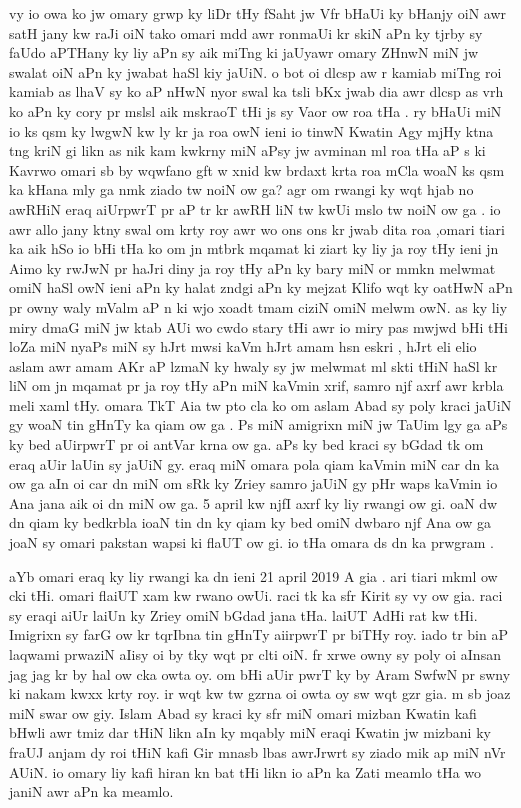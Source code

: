 \documentclass[a4paper]{article}
\begin{document}
vy io owa ko jw omary grwp ky liDr tHy  fSaht  jw Vfr bHaUi ky bHanjy oiN awr satH jany kw raJi oiN tako omari mdd awr ronmaUi kr   skiN aPn ky tjrby sy faUdo aPTHany ky liy                                                                                                                                    aPn sy aik miTng ki jaUyawr omary ZHnwN miN jw swalat oiN aPn ky jwabat haSl kiy jaUiN.
o bot oi dlcsp aw r kamiab miTng roi  kamiab  as lhaV sy ko aP nHwN nyor swal ka tsli bKx jwab dia awr dlcsp as vrh ko aPn ky cory pr mslsl aik mskraoT tHi js sy Vaor ow roa tHa  .
ry bHaUi miN io ks qsm ky lwgwN kw ly kr ja roa owN ieni io tinwN Kwatin Agy mjHy ktna tng kriN gi likn as nik kam kwkrny miN  aPsy jw avminan ml roa tHa aP s ki  Kavrwo omari sb by wqwfano gft w xnid kw brdaxt krta roa mCla woaN ks qsm ka kHana mly ga nmk ziado tw noiN ow ga? agr om rwangi ky wqt hjab no awRHiN  eraq  aiUrpwrT pr aP tr kr awRH liN tw kwUi mslo tw noiN ow ga .
io awr allo jany ktny swal om krty roy awr wo ons ons kr jwab dita roa     ,omari tiari ka aik hSo io bHi tHa ko om jn mtbrk mqamat ki ziart ky liy ja  roy tHy ieni jn Aimo ky rwJwN pr haJri diny ja roy tHy aPn ky bary miN or mmkn melwmat omiN haSl owN ieni aPn ky halat zndgi aPn ky mejzat Klifo wqt ky oatHwN aPn pr owny waly mValm aP n ki wjo xoadt tmam ciziN omiN melwm owN.
as ky liy miry dmaG miN jw ktab AUi wo cwdo stary tHi awr io miry pas mwjwd bHi tHi loZa miN nyaPs miN sy hJrt mwsi kaVm hJrt  amam hsn eskri , hJrt eli elio aslam awr amam AKr aP lzmaN ky hwaly sy jw melwmat ml skti tHiN haSl  kr liN om jn mqamat pr ja roy tHy aPn miN kaVmin xrif, samro njf axrf awr krbla meli xaml tHy.
omara TkT Aia tw  pto cla  ko om aslam Abad sy poly kraci jaUiN gy woaN tin gHnTy ka qiam ow ga .
Ps miN amigrixn miN jw TaUim lgy ga aPs ky bed aUirpwrT pr oi antVar krna ow ga.
aPs ky bed kraci sy bGdad tk om eraq aUir laUin sy jaUiN  gy.
eraq miN omara pola qiam kaVmin miN car dn ka ow ga aIn oi car dn miN om sRk ky Zriey samro  jaUiN gy pHr waps  kaVmin io Ana jana aik oi dn miN ow ga.
5 april kw njfI axrf ky liy rwangi ow gi.
oaN dw dn qiam  ky bedkrbla  ioaN tin dn ky qiam ky bed omiN dwbaro njf Ana  ow ga  joaN sy omari  pakstan wapsi ki flaUT ow gi.
io tHa omara ds dn ka prwgram .

aYb omari eraq ky liy rwangi ka dn ieni 21  april 2019 A gia .
ari tiari mkml ow cki tHi.
omari flaiUT xam kw rwano owUi.
raci tk ka sfr Kirit sy vy ow gia.
raci sy eraqi aiUr laiUn ky Zriey omiN bGdad jana tHa.
laiUT AdHi rat kw tHi.
Imigrixn sy farG  ow kr tqrIbna tin gHnTy aiirpwrT pr biTHy roy.
iado tr bin aP laqwami prwaziN aIisy oi by tky wqt pr clti oiN.
fr xrwe owny sy poly oi aInsan jag jag kr by hal ow cka owta oy.
om bHi aUir pwrT ky by Aram SwfwN pr swny ki nakam kwxx krty roy.
ir wqt kw tw gzrna oi owta oy sw wqt gzr gia.
m sb joaz miN swar ow giy.
Islam Abad sy kraci ky sfr miN omari mizban Kwatin kafi bHwli awr tmiz dar tHiN likn aIn ky mqably miN eraqi Kwatin jw mizbani ky fraUJ anjam dy roi tHiN kafi Gir mnasb  lbas awrJrwrt sy ziado mik ap miN nVr AUiN.
io omary liy kafi hiran kn bat tHi likn io aPn ka Zati meamlo tHa wo janiN awr aPn ka meamlo.
\end{document}
